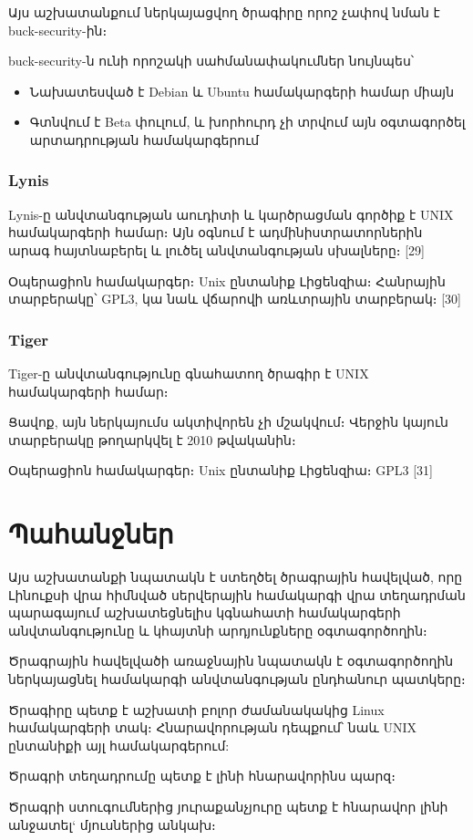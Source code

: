 \documentclass[12pt]{article}
\begin{document}
\begin{sloppypar}
Այս աշխատանքում ներկայացվող ծրագիրը որոշ չափով նման է buck-security-ին։

buck-security-ն ունի որոշակի սահմանափակումներ նույնպես՝
\begin{itemize}
\item Նախատեսված է Debian և Ubuntu համակարգերի համար միայն
\item Գտնվում է Beta փուլում, և խորհուրդ չի տրվում այն օգտագործել
	արտադրության համակարգերում
\end{itemize}


\subsubsection{Lynis}


Lynis-ը անվտանգության աուդիտի և կարծրացման գործիք է UNIX համակարգերի համար։
Այն օգնում է ադմինիստրատորներին արագ հայտնաբերել և լուծել
անվտանգության սխալները։
[29]

Օպերացիոն համակարգեր։ Unix ընտանիք
Լիցենզիա։ Հանրային տարբերակը՝ GPL3, կա նաև վճարովի առևտրային տարբերակ։
[30]


\subsubsection{Tiger}


Tiger-ը անվտանգությունը գնահատող ծրագիր է UNIX համակարգերի համար։

Ցավոք, այն ներկայումս ակտիվորեն չի մշակվում։ Վերջին կայուն տարբերակը
թողարկվել է 2010 թվականին։

Օպերացիոն համակարգեր։ Unix ընտանիք
Լիցենզիա։ GPL3
[31]


\section{Պահանջներ}


Այս աշխատանքի նպատակն է ստեղծել ծրագրային հավելված, որը Լինուքսի
վրա հիմնված սերվերային համակարգի վրա տեղադրման պարագայում
աշխատեցնելիս կգնահատի համակարգերի անվտանգությունը և կհայտնի
արդյունքները օգտագործողին։

Ծրագրային հավելվածի առաջնային նպատակն է օգտագործողին ներկայացնել
համակարգի անվտանգության ընդհանուր պատկերը։

Ծրագիրը պետք է աշխատի բոլոր ժամանակակից Linux համակարգերի տակ։
Հնարավորության դեպքում՝ նաև UNIX ընտանիքի այլ համակարգերում:

Ծրագրի տեղադրումը պետք է լինի հնարավորինս պարզ։

Ծրագրի ստուգումներից յուրաքանչյուրը պետք է հնարավոր լինի անջատել`
մյուսներից անկախ։


\end{sloppypar}
\end{document}
